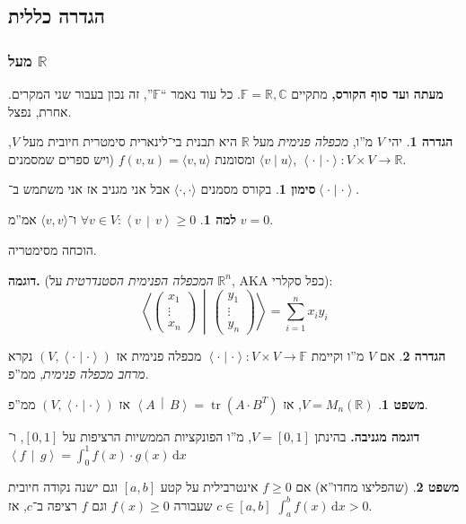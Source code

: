 \documentclass[a4paper]{article}
\newcommand\R     {\mathbb{R}}
\newcommand\C     {\mathbb{C}}
\newcommand\ra    {\rangle}
\newcommand\la    {\langle}
\newcommand\dx    {\,\mathrm{d}x}
\DeclareMathOperator{\tr}      {tr}
\newcommand\F         {\mathbb{F}}
\newcommand\co        {\colon}
\newcommand\pms[1]    {\begin{pmatrix}
		#1
\end{pmatrix}}
\newcommand\smut      {\left \la \cdot \mid \cdot \right \ra}
\newcommand\mut [2]   {\left \la #1 \,\middle\vert\, #2 \right \ra}
\theoremstyle{definition}
\newtheorem{Theorem}{\color{myblue}משפט}
\newtheorem{Definition}{\color{mygreen}הגדרה}
\newtheorem{Lemma}{\color{myyellow}למה}
\newtheorem{Notion}{\color{myred}סימון}
\newcommand\theo  [1] {\begin{Theorem}#1\end{Theorem}}
\newcommand\defi  [1] {\begin{Definition}#1\end{Definition}}
\newcommand\lem   [1] {\begin{Lemma}#1\end{Lemma}}
\newcommand\noti  [1] {\begin{Notion}#1\end{Notion}}
\begin{document}
	\subsection{הגדרה כללית}
	\subsubsection{מעל $\R$}
	\textbf{מעתה ועד סוף הקורס, }מתקיים $\F = \R, \C$. 
	כל עוד נאמר ``$\F$'', זה נכון בעבור שני המקרים. אחרת, נפצל. 
	
	\defi{יהי $V$ מ''ו, \textit{מכפלה פנימית} מעל $\R$ היא תבנית בי־לינארית סימטרית חיובית מעל $V$, ומסומנת $f(v, u) = \la v, u \ra$ (ויש ספרים שמסמנים $\la v \mid u \ra$, $\smut\co V \times V \to \R$. }
	\noti{בקורס מסמנים $\la \cdot, \cdot \ra$ אבל אני מגניב אז אני משתמש ב־$\smut$. }
	
	\lem{$\forall v \in V \co \mut{v}{v} \ge 0$ ו־$\la v, v \ra$ אמ''מ $v = 0$. }הוכחה מסימטריה. 
	
	\textbf{דוגמה. }(\textit{המכפלה הפנימית הסטנדרטית} על $\R^n$, AKA כפל סקלרי): 
	\[ \mut{\pms{x_1 \\ \vdots\\ x_n}}{\pms{y_1 \\ \vdots \\ y_n}} = \sum_{i = 1}^{n}x_iy_i \]
	
	\defi{אם $V$ מ''ו וקיימת $\smut \co V \times V \to \F$ מכפלה פנימית אז $(V, \smut)$ נקרא \textit{מרחב מכפלה פנימית}, ממ''פ. }
	
	\theo{$V = M_n(\R)$, אז $\mut{A}{B} = \tr(A \cdot B^T)$ אז $(V, \smut)$ ממ''פ. }
	
	\textbf{דוגמה מגניבה. }בהינתן $V = [0, 1]$, מ''ו הפונקציות הממשיות הרציפות על $[0, 1]$, ו־$\mut{f}{g} = \int_0^1 f(x) \cdot g(x) \dx$ 
	\theo{(שהפליצו מחדו''א) אם $f \ge 0$ אינטרבילית על קטע $[a, b]$ וגם ישנה נקודה חיובית $c \in [a, b]$ שעבורה $f(x) \ge 0$ וגם $f$ רציפה ב־$c$, אז $\int^b_a f(x) \dx > 0$. }
	
\end{document}
